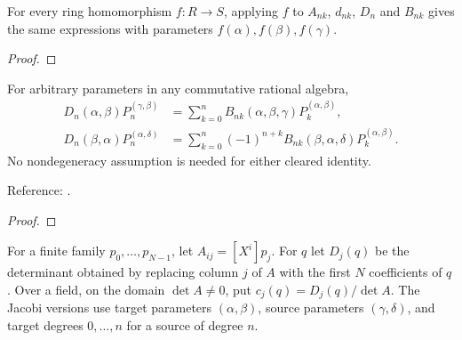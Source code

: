 \begin{supporting}

\begin{theorem}
\label{thm:jacobi-connection-data-maps}
\leanok
For every ring homomorphism $f:R\to S$, applying $f$ to $A_{nk}$, $d_{nk}$,
$D_n$ and $B_{nk}$ gives the same expressions with parameters
$f(\alpha),f(\beta),f(\gamma)$.
\end{theorem}
\begin{proof}
\leanok
\end{proof}

\begin{theorem}
\label{thm:jacobi-universal-connection}
\leanok
For arbitrary parameters in any commutative rational algebra,
\begin{align*}
 D_n(\alpha,\beta)P_n^{(\gamma,\beta)}
   &=\sum_{k=0}^n B_{nk}(\alpha,\beta,\gamma)P_k^{(\alpha,\beta)},\\
 D_n(\beta,\alpha)P_n^{(\alpha,\delta)}
   &=\sum_{k=0}^n(-1)^{n+k}B_{nk}(\beta,\alpha,\delta)P_k^{(\alpha,\beta)}.
\end{align*}
No nondegeneracy assumption is needed for either cleared identity.

Reference: \cite[18.18.14 and Table 18.6.1]{dlmf}.
\end{theorem}
\begin{proof}
\leanok
\end{proof}

\begin{definition}
\label{def:finite-connections}
\leanok
For a finite family $p_0,\ldots,p_{N-1}$, let $A_{ij}=[X^i]p_j$.
For $q$ let $D_j(q)$ be the determinant obtained by replacing column $j$ of $A$
with the first $N$ coefficients of $q$. Over a field, on the domain $\det A\ne0$, put $c_j(q)=D_j(q)/\det A$.
The Jacobi versions use target parameters $(\alpha,\beta)$, source parameters
$(\gamma,\delta)$, and target degrees $0,\ldots,n$ for a source of degree $n$.


\end{definition}
\end{supporting}
